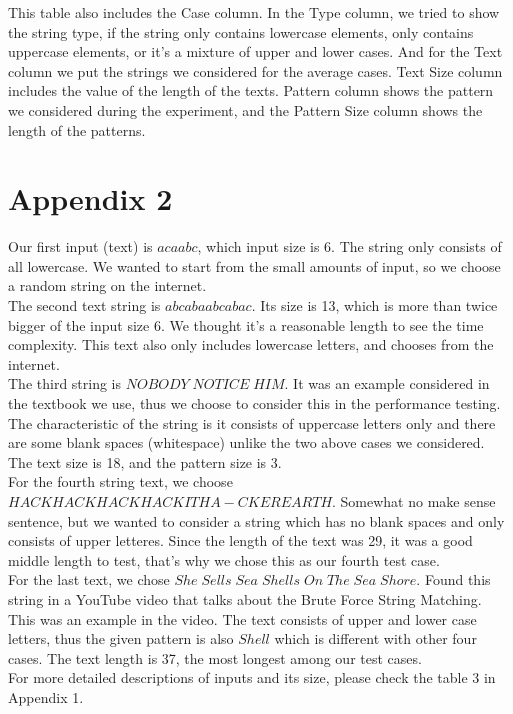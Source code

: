 \documentclass{article}
\begin{document}
This table also includes the Case column. In the Type column, we tried to show the string type, if the string only contains lowercase elements, only contains uppercase elements, or it's a mixture of upper and lower cases. And for the Text column we put the strings we considered for the average cases. Text Size column includes the value of the length of the texts. Pattern column shows the pattern we considered during the experiment, and the Pattern Size column shows the length of the patterns.

\section{\textbf{Appendix 2}}
\indent Our first input (text) is $acaabc$, which input size is 6. The string only consists of all lowercase. We wanted to start from the small amounts of input, so we choose a random string on the internet. \\ 
\indent The second text string is $abcabaabcabac$. Its size is 13, which is more than twice bigger of the input size 6. We thought it's a reasonable length to see the time complexity. This text also only includes lowercase letters, and chooses from the internet. \\
\indent The third string is $NOBODY \; NOTICE \; HIM$. It was an example considered in the textbook we use, thus we choose to consider this in the performance testing. The characteristic of the string is it consists of uppercase letters only and there are some blank spaces (whitespace) unlike the two above cases we considered. The text size is 18, and the pattern size is 3. \\
\indent For the fourth string text, we choose $HACKHACKHACKHACKITHA- CKEREARTH$. Somewhat no make sense sentence, but we wanted to consider a string which has no blank spaces and only consists of upper letteres. Since the length of the text was 29, it was a good middle length to test, that's why we chose this as our fourth test case.\\
\indent For the last text, we chose $She \; Sells \; Sea \; Shells \; On \; The \; Sea \; Shore$. Found this string in a YouTube video that talks about the Brute Force String Matching. This was an example in the video. The text consists of upper and lower case letters, thus the given pattern is also $Shell$ which is different with other four cases. The text length is 37, the most longest among our test cases. \\
\indent For more detailed descriptions of inputs and its size, please check the table 3 in Appendix 1.
\end{document}
